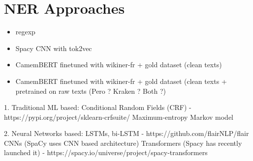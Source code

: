 \section{NER Approaches}

\begin{itemize}
    \item regexp
    \item Spacy CNN with tok2vec
    \item CamemBERT finetuned with wikiner-fr + gold dataset (clean texts)
    \item CamemBERT finetuned with wikiner-fr + gold dataset (clean texts + pretrained on raw texts (Pero ? Kraken ? Both ?)
\end{itemize}


1. Traditional ML based:
    Conditional Random Fields (CRF) - https://pypi.org/project/sklearn-crfsuite/
    Maximum-entropy Markov model

2. Neural Networks based:
    LSTMs, bi-LSTM - https://github.com/flairNLP/flair
    CNNs (SpaCy uses CNN based architecture)
    Transformers (Spacy has recently launched it) - https://spacy.io/universe/project/spacy-transformers